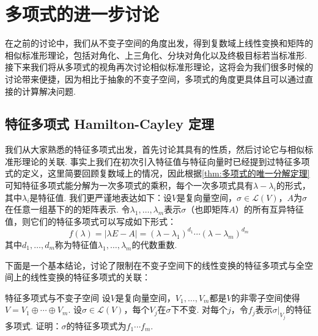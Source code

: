 \chapter{多项式的进一步讨论}

在之前的讨论中，我们从不变子空间的角度出发，得到复数域上线性变换和矩阵的相似标准形理论，包括对角化、上三角化、分块对角化以及终极目标若当标准形. 接下来我们将从多项式的视角再次讨论相似标准形理论，这将会为我们很多时候的讨论带来便捷，因为相比于抽象的不变子空间，多项式的角度更具体且可以通过直接的计算解决问题.

\section{特征多项式 \quad Hamilton-Cayley 定理}

我们从大家熟悉的特征多项式出发，首先讨论其具有的性质，然后讨论它与相似标准形理论的关联. 事实上我们在初次引入特征值与特征向量时已经提到过特征多项式的定义，这里简要回顾复数域上的情况，因此根据\autoref{thm:多项式的唯一分解定理} 可知特征多项式能分解为一次多项式的乘积，每个一次多项式具有$\lambda-\lambda_i$的形式，其中$\lambda_i$是特征值. 我们更严谨地表达如下：设$V$是复向量空间，$\sigma\in \mathcal{L}(V)$，$A$为$\sigma$在任意一组基下的的矩阵表示. 令$\lambda_1,\ldots,\lambda_m$表示$\sigma$（也即矩阵$A$）的所有互异特征值，则它们的特征多项式可以写成如下形式：
\begin{equation}\label{eq:18:特征多项式}
    f(\lambda)=|\lambda E-A|=(\lambda-\lambda_1)^{d_1}\cdots(\lambda-\lambda_m)^{d_m}
\end{equation}
其中$d_1,\ldots,d_m$称为特征值$\lambda_1,\ldots,\lambda_m$的代数重数.

下面是一个基本结论，讨论了限制在不变子空间下的线性变换的特征多项式与全空间上的线性变换的特征多项式的关联：
\begin{theorem}{}{特征多项式与不变子空间}
    设$V$是复向量空间，$V_1,\ldots,V_m$都是$V$的非零子空间使得$V=V_1\oplus\cdots\oplus V_m$. 设$\sigma\in \mathcal{L}(V)$，每个$V_j$在$\sigma$下不变. 对每个$j$，令$f_j$表示$\sigma\vert_{V_j}$的特征多项式. 证明：$\sigma$的特征多项式为$f_1\cdots f_m$.
\end{theorem}

